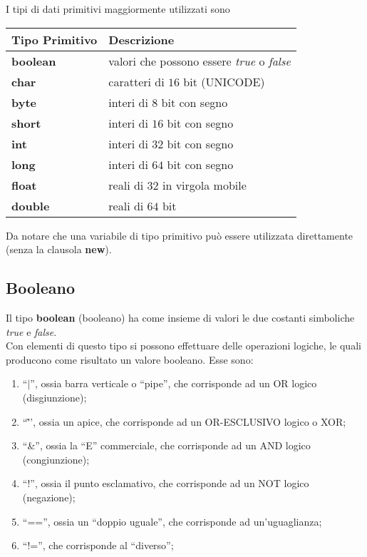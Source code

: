 \documentclass[a4paper]{extarticle}
\newcommand{\quotes}[1]{``#1''}
\begin{document}
\vspace{1em}
\noindent
I tipi di dati primitivi maggiormente utilizzati sono

\vspace{1em}
\noindent
{}
\begin{tabularx}{\textwidth}{|P|P|}
  \hline
  Tipo Primitivo & Descrizione\\
  \hline
  \textbf{boolean} & valori che possono essere \emph{true} o \emph{false}\\
  \hline
  \textbf{char} & caratteri di $16$ bit (UNICODE)\\
  \hline
  \textbf{byte} & interi di $8$ bit con segno\\
  \hline
  \textbf{short} & interi di $16$ bit con segno\\
  \hline
  \textbf{int} & interi di $32$ bit con segno\\
  \hline
  \textbf{long} & interi di $64$ bit con segno\\
  \hline
  \textbf{float} & reali di $32$ in virgola mobile\\
  \hline
  \textbf{double} & reali di $64$ bit\\
  \hline
\end{tabularx}

\vspace{1em}
\noindent
Da notare che una variabile di tipo primitivo può essere utilizzata direttamente (senza la clausola \textbf{new}).

\vspace{1em}
\subsection{Booleano}
Il tipo \textbf{boolean} (booleano) ha come insieme di valori le due costanti simboliche \emph{true} e \emph{false}.\\
Con elementi di questo tipo si possono effettuare delle operazioni logiche, le quali producono come risultato un valore booleano. Esse sono:
\begin{enumerate}
  \item \quotes{$\vert$}, ossia barra verticale o \quotes{pipe}, che corrisponde ad un OR logico (disgiunzione);
  \item \quotes{\^}, ossia un apice, che corrisponde ad un OR-ESCLUSIVO logico o XOR;
  \item \quotes{\&}, ossia la \quotes{E} commerciale, che corrisponde ad un AND logico (congiunzione);
  \item \quotes{!}, ossia il punto esclamativo, che corrisponde ad un NOT logico (negazione);
  \item \quotes{==}, ossia un \quotes{doppio uguale}, che corrisponde ad un'uguaglianza;
  \item \quotes{!=}, che corrisponde al \quotes{diverso};
\end{enumerate}
\end{document}
